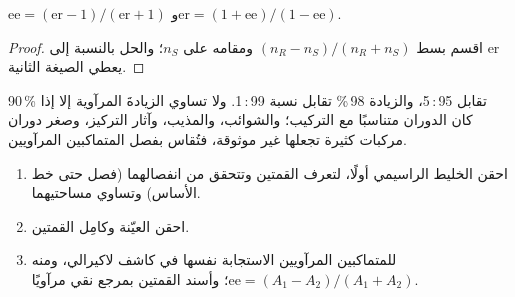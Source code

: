 \begin{proposition}[ee وer]\label{prop:b3:asymmetric-synthesis:ee-er}
$\mathrm{ee} = (\mathrm{er} - 1)/(\mathrm{er} + 1)$ و$\mathrm{er} = (1 + \mathrm{ee})/(1 - \mathrm{ee})$.
\end{proposition}

\begin{proof}
اقسم بسط $(n_R - n_S)/(n_R + n_S)$ ومقامه على $n_S$؛ والحل بالنسبة إلى er يعطي
الصيغة الثانية.
\end{proof}

 90\,\% تقابل  95\,:\,5، والزيادة 98\,\% تقابل نسبة 99\,:\,1. ولا تساوي 
الزيادةَ المرآوية إلا إذا كان الدوران متناسبًا مع التركيب؛ والشوائب، 
والمذيب، وآثار التركيز، وصغر دوران مركبات كثيرة تجعلها
غير موثوقة، فتُقاس  بفصل المتماكبين المرآويين.

\begin{method}\label{met:b3:asymmetric-synthesis:ee-chromatogram}
\begin{enumerate}
  \item احقن الخليط الراسيمي أولًا، لتعرف القمتين وتتحقق من
        انفصالهما (فصل حتى خط الأساس) وتساوي مساحتيهما.
  \item احقن العيّنة وكامِل القمتين.
  \item للمتماكبين المرآويين الاستجابة نفسها في كاشف لاكيرالي، ومنه
        $\mathrm{ee} = (A_1 - A_2)/(A_1 + A_2)$؛ وأسند القمتين بمرجع نقي مرآويًا.
\end{enumerate}
\end{method}


